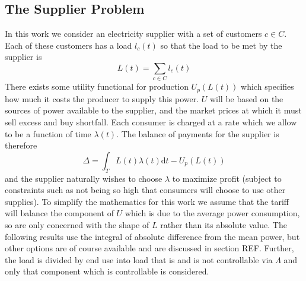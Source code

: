 \documentclass[a4paper, 10 pt, conference]{ieeeconf}  %
\begin{document}
\subsection{The Supplier Problem}
In this work we consider an electricity supplier with a set of customers $c \in C$. Each of these customers has a load $l_{c}(t)$  so that the load to be met by the supplier is
\begin{equation}
L(t) = \sum_{c \in C} l_{c}(t)
\end{equation}
There exists some utility functional for production $U_{p}(L(t))$ which specifies how much it costs the producer to supply this power. $U$ will be based on the sources of power available to the supplier, and the market prices at which it must sell excess and buy shortfall.
Each consumer is charged at a rate which we allow to be a function of time $\lambda (t)$. The balance of payments for the supplier is therefore
\begin{equation}
\Delta = \int_{T}L(t) \lambda(t) \mathrm{d}t - U_{p}(L(t))
\end{equation}
and the supplier naturally wishes to choose $\lambda$ to maximize profit (subject to constraints such as not being so high that consumers will choose to use other supplies). To simplify the mathematics for this work we assume that the tariff will balance the component of $U$ which is due to the average power consumption, so are only concerned with the shape of $L$ rather than its absolute value. The following results use the integral of absolute difference from the mean power, but other options are of course available and are discussed in section REF.
Further, the load is divided by end use into load that is and is not controllable via $\Lambda$ and only that component which is controllable is considered.
\end{document}
